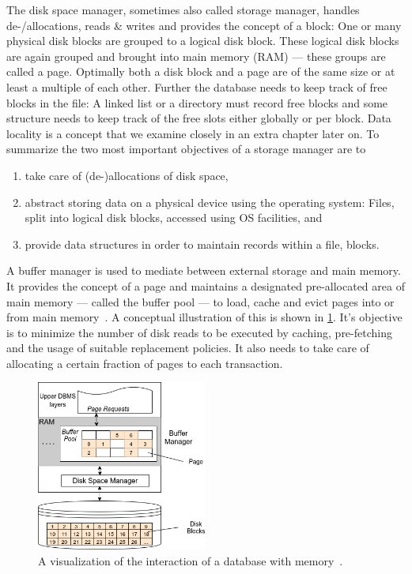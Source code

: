     The disk space manager, sometimes also called storage manager, handles de-/allocations, reads \& writes and provides the concept of a block: One or many physical disk blocks are grouped to a logical disk block.
    These logical disk blocks are again grouped and brought into main memory (RAM) --- these groups are called a page.
    Optimally both a disk block and a page are of the same size or at least a multiple of each other. 
    Further the database needs to keep track of free blocks in the file: 
    A linked list or a directory must record free blocks and some structure needs to keep track of the free slots either globally or per block. 
    Data locality is a concept that we examine closely in an extra chapter later on.
    To summarize the two most important objectives of a storage manager are to
    \begin{enumerate} 
     \item take care of (de-)allocations of disk space,
     \item abstract storing data on a physical device using the operating system: Files, split into logical disk blocks, accessed using OS facilities, and
     \item provide data structures in order to maintain records within a file, blocks.
    \end{enumerate}
    
    A buffer manager is used to mediate between external storage and main memory. 
    It provides the concept of a page and maintains a designated pre-allocated area of main memory --- called the buffer pool --- to load, cache and evict pages into or from main memory~\autocite{ramakrishnan2000database}.
    A conceptual illustration of this is shown in \ref{buf-man}.
    It's objective is to minimize the number of disk reads to be executed by caching, pre-fetching and the usage of suitable replacement policies. 
    It also needs to take care of allocating a certain fraction of pages to each transaction.

    \begin{figure}[htp]\label{dbms_memory}
        \begin{center}
        \includegraphics[keepaspectratio,height=0.4\textheight,width=0.5\textwidth]{img/04-databases/RDBMS_memory_view.png}
        \end{center}
        \caption{A visualization of the interaction of a database with memory~\autocite{ramakrishnan2000database}.}
        \label{buf-man}
    \end{figure}

